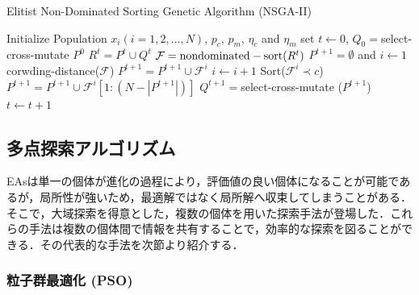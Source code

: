 \documentclass[a4j,11pt]{jarticle}
\begin{document}
\begin{algorithm}[H]
\caption{Elitist Non-Dominated Sorting Genetic Algorithm (NSGA-II)}
\label{code:nsga}
\begin{algorithmic}[3]
\REQUIRE Initialize Population $x_i (i=1, 2,..., N)$, $p_c$, $p_m$, $\eta_c$ and $\eta_m$
\STATE set $t \leftarrow 0$, $Q_0=$select-cross-mutate $P^0$
\STATE $R^t=P^t \cup Q^t$
\STATE $\mathcal{F} = {\rm nondominated-sort}(R^t)$
\STATE $P^{t+1}=\emptyset$ and $i \leftarrow 1$
\STATE corwding-distance($\mathcal{F}$)
\STATE $P^{t+1}=P^{t+1} \cup \mathcal{F}^i$
\STATE $i \leftarrow i+1$
\ENDWHILE
\STATE Sort($\mathcal{F}^i \prec c$)
\STATE $P^{t+1}=P^{t+1} \cup \mathcal{F}^i[1:(N-|P^{t+1}|)]$
\STATE $Q^{t+1}=$select-cross-mutate ($P^{t+1}$)
\STATE $t \leftarrow t+1$
\ENDWHILE 
\end{algorithmic}
\end{algorithm}

\subsection{多点探索アルゴリズム}
\label{ss:swarm}
EAsは単一の個体が進化の過程により，評価値の良い個体になることが可能であるが，局所性が強いため，最適解ではなく局所解へ収束してしまうことがある．そこで，大域探索を得意とした，複数の個体を用いた探索手法が登場した．これらの手法は複数の個体間で情報を共有することで，効率的な探索を図ることができる．その代表的な手法を次節より紹介する．

\subsubsection{粒子群最適化 (PSO)}
\label{sss:PSO}

  \makeatletter
    \renewcommand{\theequation}{%
    \thesection.\arabic{equation}}
  \makeatother
  \makeatletter
    \renewcommand{\thefigure}{%
    \thesection.\arabic{figure}}
  \makeatother
\end{document}
